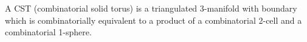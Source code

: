 A CST (combinatorial solid torus) is a triangulated 3-manifold with boundary which is combinatorially equivalent to a product of a combinatorial 2-cell and a combinatorial 1-sphere.

